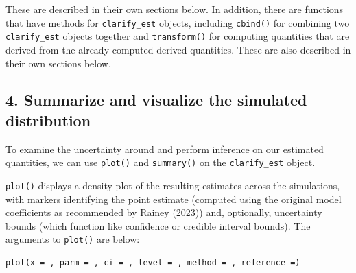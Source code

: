 These are described in their own sections below. In addition, there are functions that have methods for \texttt{clarify\_est} objects, including \texttt{cbind()} for combining two \texttt{clarify\_est} objects together and \texttt{transform()} for computing quantities that are derived from the already-computed derived quantities. These are also described in their own sections below.

\hypertarget{summarize-and-visualize-the-simulated-distribution}{%
\subsection{4. Summarize and visualize the simulated distribution}\label{summarize-and-visualize-the-simulated-distribution}}

To examine the uncertainty around and perform inference on our estimated quantities, we can use \texttt{plot()} and \texttt{summary()} on the \texttt{clarify\_est} object.

\texttt{plot()} displays a density plot of the resulting estimates across the simulations, with markers identifying the point estimate (computed using the original model coefficients as recommended by Rainey (2023)) and, optionally, uncertainty bounds (which function like confidence or credible interval bounds). The arguments to \texttt{plot()} are below:

\begin{verbatim}
plot(x = , parm = , ci = , level = , method = , reference =)
\end{verbatim}

